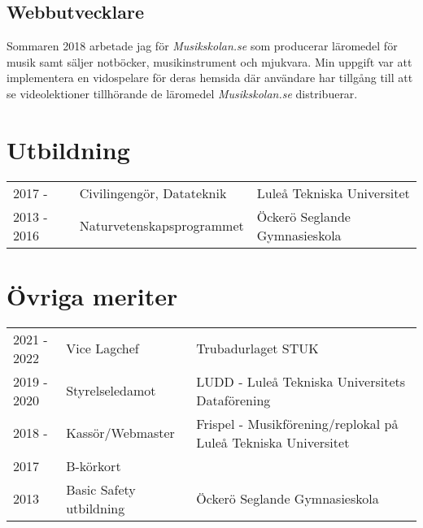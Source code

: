 \documentclass{article}
\begin{document}

\subsection{Webbutvecklare}
Sommaren 2018 arbetade jag för \textit{Musikskolan.se} som producerar läromedel för musik samt säljer notböcker, musikinstrument och mjukvara.
Min uppgift var att implementera en vidospelare för deras hemsida där användare har tillgång till att se videolektioner 
tillhörande de läromedel \textit{Musikskolan.se} distribuerar.


\newpage

\section{Utbildning}
\begin{tabular}{p{} p{} p{}}
    2017 - 		&	Civilingengör, Datateknik	& Luleå Tekniska Universitet 	\\
    2013 - 2016 &	Naturvetenskapsprogrammet	& Öckerö Seglande Gymnasieskola \\
\end{tabular}
%
\section{Övriga meriter}
\begin{tabular}{p{} p{} p{}}
    2021 - 2022 & Vice Lagchef				& Trubadurlaget STUK 												\\
    2019 - 2020 & Styrelseledamot	 		& LUDD - Luleå Tekniska Universitets Dataförening					\\ 
    2018 - 		& Kassör/Webmaster			& Frispel - Musikförening/replokal på Luleå Tekniska Universitet	\\ 
    2017 		& B-körkort 				&																	\\ 
    2013 		& Basic Safety utbildning  	& Öckerö Seglande Gymnasieskola
\end{tabular}
%
\end{document}
